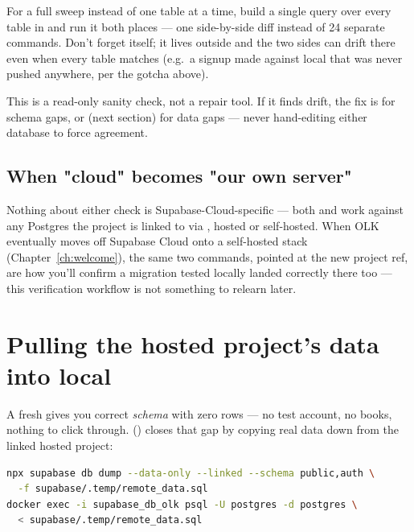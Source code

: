\begin{olktip}
For a full sweep instead of one table at a time, build a single  query over every table in  and run it both places — one side-by-side diff instead of 24 separate commands. Don't forget  itself; it lives outside  and the two sides can drift there even when every  table matches (e.g.\ a signup made against local that was never pushed anywhere, per the  gotcha above).
\end{olktip}

\begin{olknote}
This is a read-only sanity check, not a repair tool. If it finds drift, the fix is  for schema gaps, or  (next section) for data gaps — never hand-editing either database to force agreement.
\end{olknote}

\subsection{When "cloud" becomes "our own server"}
\label{sec:cloud-becomes-server}

Nothing about either check is Supabase-Cloud-specific — both  and  work against any Postgres the project is linked to via , hosted or self-hosted. When OLK eventually moves off Supabase Cloud onto a self-hosted stack (Chapter~\ref{ch:welcome}), the same two commands, pointed at the new project ref, are how you'll confirm a migration tested locally landed correctly there too — this verification workflow is not something to relearn later.

\section{Pulling the hosted project's data into local}
\label{sec:pull-data}

A fresh  gives you correct \emph{schema} with zero rows — no test account, no books, nothing to click through.  () closes that gap by copying real data down from the linked hosted project:

\begin{lstlisting}[style=olkcodebash, language=bash, caption={scripts/pull-remote-data.sh — the whole script}]
npx supabase db dump --data-only --linked --schema public,auth \
  -f supabase/.temp/remote_data.sql
docker exec -i supabase_db_olk psql -U postgres -d postgres \
  < supabase/.temp/remote_data.sql
\end{lstlisting}

